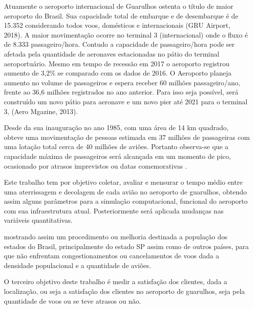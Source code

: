 \documentclass[12pt]{article}
\begin{document}
  Atuamente o aeroporto internacional de Guarulhos ostenta o título de maior
  aeroporto do Brasil. Sua capacidade total de embarque e de desembarque é
  de 15.352 considerando todos voos, domésticos e internacionais (GRU Airport, 2018).
  A maior movimentação ocorre no terminal 3 (internacional) onde o fluxo  é de
  8.333 passageiro/hora. Contudo a capacidade de passageiro/hora pode ser 
  afetada pela quantidade de aeronaves estacionadas no pátio do terminal
  aeroportuário. Mesmo em tempo de recessão em 2017 o aeroporto registrou 
  aumento de 3,2\% se comparado com os dados de 2016. O Aeroporto planeja
  aumento no volume de passageiros e espera receber 60 milhões passageiro/ano,
  frente ao 36,6 milhões registrados no ano anterior. Para isso seja possível,
  será construído um novo pátio para aeronave e um novo pier até 2021 para o 
  terminal 3, (Aero Mgazine, 2013).

  Desde da sua inauguração no ano 1985, com uma área de 14 km quadrado,
  obteve uma movimentação de pessoas estimada em  37 milhões de passageiras
  com uma lotação total cerca de 40 milhões de aviões. Portanto observa-se
  que a capacidade máxima de passageiros será alcançada em um momento de
  pico, ocasionado por atrasos imprevistos ou datas comemorativas
  \cite{Moser:07}.
  



Este trabalho tem por objetivo coletar, avaliar e mensurar o tempo médio
entre uma aterrissagem e  decolagem de cada avião no aeroporto de guarulhos,
obtendo assim alguns parâmetros para a simulação computacional, funcional 
do aeroporto com sua infraestrutura atual.
Posteriormente será  aplicada mudanças nas variáveis quantitativas.

mostrando assim um procedimento ou melhoria destinada  a população dos
estados do Brasil, principalmente do estado SP assim como de outros países,
para que não enfrentam congestionamentos ou cancelamentos de voos dada a 
densidade populacional e a quantidade de aviões.

O terceiro objetivo deste trabalho é medir a satisfação dos clientes, dada
a localização, ou seja a satisfação dos clientes no aeroporto de guarulhos, 
seja pela quantidade de voos ou se teve atrasos ou não.
\end{document}
